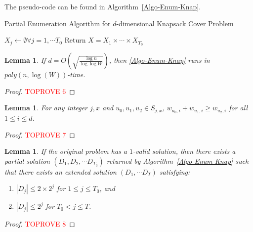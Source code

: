 \documentclass[11pt,a4paper]{article} \usepackage{enumitem}
\newtheorem{lemma}[theorem]{Lemma}
\theoremstyle{definition}
\begin{document}
The pseudo-code can be found in Algorithm~\ref{Algo-Enum-Knap}.
\begin{algorithm}
\caption{Partial Enumeration Algorithm for $d$-dimensional Knapsack Cover Problem} \label{Algo-Enum-Knap}
$X_j\gets \emptyset\forall j=1,\cdots T_0$\;
Return $X=X_1\times \cdots \times X_{T_0}$\;
\end{algorithm}


\begin{lemma}\label{lem:Knap-Enum-1}
If \(d = O\left(\sqrt{\frac{\log n}{\log\log W}}\right)\), then \cref{Algo-Enum-Knap} runs in \(poly(n, \log(W))\)-time.
\end{lemma}
\begin{proof}\textcolor{red}{TOPROVE 6}\end{proof}

\begin{lemma}\label{lem:Knap-Enum-Replace}
For any integer \(j, x\) and \(u_0, u_1, u_2 \in S_{j,x}\), \(w_{u_0,i} + w_{u_1,i} \ge w_{u_2,i}\) for all \(1 \le i \le d\). 
\end{lemma}
\begin{proof}\textcolor{red}{TOPROVE 7}\end{proof}

\begin{lemma}\label{lem:Knap-Enum-2}
If the original problem has a $1$-valid solution, then there exists a partial solution $(D_1, D_2, \cdots D_{T_0})$ returned by 
Algorithm~\ref{Algo-Enum-Knap} 
such that there exists an extended solution $(D_1, \cdots D_T)$ satisfying:
\begin{enumerate}
    \item $|D_j| \le 2 \times 2^j$ for $1 \le j \le T_0$, and 
    \item $|D_j| \le 2^j$ for $T_0 < j \le T$.
\end{enumerate}
\end{lemma}
\begin{proof}\textcolor{red}{TOPROVE 8}\end{proof}
\end{document}
